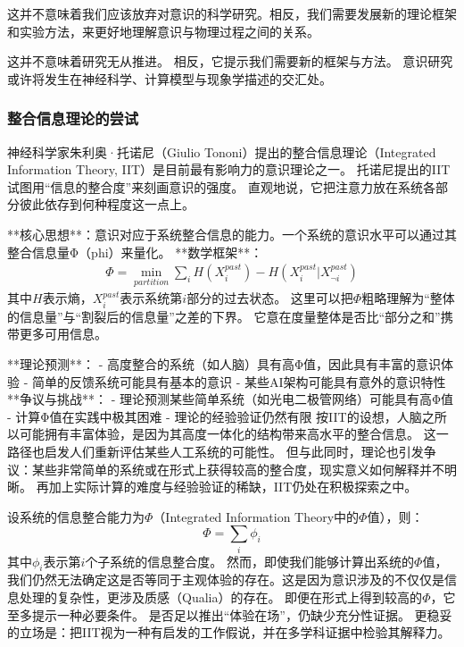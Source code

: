 \begin{center}
这并不意味着我们应该放弃对意识的科学研究。相反，我们需要发展新的理论框架和实验方法，来更好地理解意识与物理过程之间的关系。
\end{center}
这并不意味着研究无从推进。
相反，它提示我们需要新的框架与方法。
意识研究或许将发生在神经科学、计算模型与现象学描述的交汇处。

\subsubsection{整合信息理论的尝试}

神经科学家朱利奥·托诺尼（Giulio Tononi）提出的整合信息理论（Integrated Information Theory, IIT）是目前最有影响力的意识理论之一。
托诺尼提出的IIT试图用“信息的整合度”来刻画意识的强度。
直观地说，它把注意力放在系统各部分彼此依存到何种程度这一点上。

**核心思想**：意识对应于系统整合信息的能力。一个系统的意识水平可以通过其整合信息量Φ（phi）来量化。
**数学框架**：
\begin{align}
\Phi = \min_{partition} \sum_{i} H(X_i^{past}) - H(X_i^{past}|X_{\neg i}^{past})
\end{align}
其中$H$表示熵，$X_i^{past}$表示系统第$i$部分的过去状态。
这里可以把$\Phi$粗略理解为“整体的信息量”与“割裂后的信息量”之差的下界。
它意在度量整体是否比“部分之和”携带更多可用信息。

**理论预测**：
- 高度整合的系统（如人脑）具有高Φ值，因此具有丰富的意识体验
- 简单的反馈系统可能具有基本的意识
- 某些AI架构可能具有意外的意识特性
**争议与挑战**：
- 理论预测某些简单系统（如光电二极管网络）可能具有高Φ值
- 计算Φ值在实践中极其困难
- 理论的经验验证仍然有限
按IIT的设想，人脑之所以可能拥有丰富体验，是因为其高度一体化的结构带来高水平的整合信息。
这一路径也启发人们重新评估某些人工系统的可能性。
但与此同时，理论也引发争议：某些非常简单的系统或在形式上获得较高的整合度，现实意义如何解释并不明晰。
再加上实际计算的难度与经验验证的稀缺，IIT仍处在积极探索之中。

设系统的信息整合能力为$\Phi$（Integrated Information Theory中的$\Phi$值），则：
\begin{equation}
\Phi = \sum_{i} \phi_i
\end{equation}
其中$\phi_i$表示第$i$个子系统的信息整合度。
然而，即使我们能够计算出系统的$\Phi$值，我们仍然无法确定这是否等同于主观体验的存在。这是因为意识涉及的不仅仅是信息处理的复杂性，更涉及质感（Qualia）的存在。
即便在形式上得到较高的$\Phi$，它至多提示一种必要条件。
是否足以推出“体验在场”，仍缺少充分性证据。
更稳妥的立场是：把IIT视为一种有启发的工作假说，并在多学科证据中检验其解释力。

